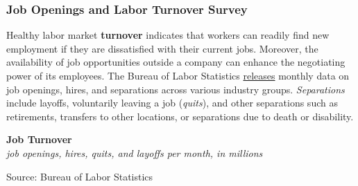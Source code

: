 \documentclass{report}
\makeatletter
\newcommand{\tbllink}[1]{\href{https://raw.githubusercontent.com/bdecon/US-chartbook/master/chartbook/data/#1}{\faTable}}
\newcommand*\short[1]{\expandafter\@gobbletwo\number\numexpr#1\relax}
\newcommand{\absnode}[3]{\node[below right, align=left] at (axis cs: #1,#2) {#3};}
\newcommand{\dateaxisticks}{
		date coordinates in=x, axis line style={draw=none},
		xmax={2024-01-31},
		max space between ticks=40,	    
		xtick={{1990-01-01}, {1992-01-01}, {1994-01-01}, 
			{1996-01-01}, {1998-01-01}, {2000-01-01}, 
			{2002-01-01}, {2004-01-01}, {2006-01-01},
			{2008-01-01}, {2010-01-01}, {2012-01-01}, {2014-01-01},
		    {2016-01-01}, {2018-01-01}, {2020-01-01}, {2022-01-01}, 
		    {2024-01-01}, {2026-01-01}},
		minor xtick={{1989-01-01}, {1991-01-01}, {1993-01-01},
			{1995-01-01}, {1997-01-01}, {1999-01-01}, 
			{2001-01-01}, {2003-01-01}, {2005-01-01}, {2007-01-01},
		    {2009-01-01}, {2011-01-01}, {2013-01-01}, {2015-01-01},
		    {2017-01-01}, {2019-01-01}, {2021-01-01}, {2023-01-01}, 
		    {2025-01-01}, {2027-01-01}},
		enlarge y limits={0.06}, enlarge x limits={0.01},
		xticklabel style={align=center, yshift=-2pt}, tick label style={inner sep=0pt},
		}
\newcommand{\bbar}[2]{extra #1 ticks = {{#2}}, extra #1 tick labels = ,
		extra #1 tick style = {grid=major, grid style={thick, black!25}},}
\newcommand{\stdline}[4]{\addplot[very thick, no markers, color=#1] 
		table [x=#2, y=#3, col sep=comma] {#4};	}
\newcommand{\rbars}{
		\fill[color=black!10] (axis cs:{1990-07-01},\pgfkeysvalueof{/pgfplots/ymin})
			rectangle (axis cs:{1991-03-01}, \pgfkeysvalueof{/pgfplots/ymax});
		\fill[color=black!10] (axis cs:{2007-12-01},\pgfkeysvalueof{/pgfplots/ymin})
			rectangle (axis cs:{2009-07-01}, \pgfkeysvalueof{/pgfplots/ymax});
		\fill[color=black!10] (axis cs:{2001-03-01},\pgfkeysvalueof{/pgfplots/ymin})
			rectangle (axis cs:{2001-11-01}, \pgfkeysvalueof{/pgfplots/ymax});
		\fill[color=black!10] (axis cs:{2020-02-01},\pgfkeysvalueof{/pgfplots/ymin})
			rectangle (axis cs:{2020-05-01}, \pgfkeysvalueof{/pgfplots/ymax});}
\makeatother
\begin{document}
{\begin{minipage}{1.0\textwidth}
\subsubsection*{Job Openings and Labor Turnover Survey}
\small Healthy labor market \textbf{turnover} indicates that workers can readily find new employment if they are dissatisfied with their current jobs. Moreover, the availability of job opportunities outside a company can enhance the negotiating power of its employees. The Bureau of Labor Statistics \href{https://www.bls.gov/news.release/pdf/jolts.pdf}{releases} monthly data on job openings, hires, and separations across various industry groups. \textit{Separations} include layoffs, voluntarily leaving a job (\textit{quits}), and other separations such as retirements, transfers to other locations, or separations due to death or disability. 

\small 
\vspace{1mm}

\normalsize \textbf{Job Turnover}\\
\footnotesize{\textit{job openings, hires, quits, and layoffs per month, in millions}}
\vspace{4.0cm}

\hspace{2mm} 

\footnotesize{Source: Bureau of Labor Statistics} \hfill \tbllink{jolts.csv} 
\vspace{3mm}


\end{minipage}}
\end{document}
